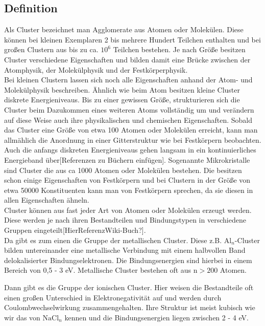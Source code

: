 \subsection{Definition}
Als Cluster bezeichnet man Agglomerate aus Atomen oder Molekülen. Diese können bei kleinen Exemplaren 2 bis mehrere Hundert Teilchen enthalten und bei großen Clustern aus bis zu ca. $\mathrm{10^6}$ Teilchen bestehen. Je nach Größe besitzen Cluster verschiedene Eigenschaften und bilden damit eine Brücke zwischen der Atomphysik, der Molekülphysik und der Festkörperphysik.\\
Bei kleinen Clustern lassen sich noch alle Eigenschaften anhand der Atom- und Molekülphysik beschreiben. Ähnlich wie beim Atom besitzen kleine Cluster diskrete Energieniveaus.
Bis zu einer gewissen Größe, strukturieren sich die Cluster beim Dazukommen eines weiteren Atoms vollständig um und verändern auf diese Weise auch ihre physikalischen und chemischen Eigenschaften. Sobald das Cluster eine Größe von etwa 100 Atomen oder Molekülen erreicht, kann man allmählich die Anordnung in einer Gitterstruktur wie bei Festkörpern beobachten. Auch die anfangs diskreten Energieniveaus gehen langsam in ein kontinuierliches Energieband über[Referenzen zu Büchern einfügen].
Sogenannte Mikrokristalle sind Cluster die aus ca 1000 Atomen oder Molekülen bestehen. Die besitzen schon einige Eigenschaften von Festkörpern und bei Clustern in der Größe von etwa 50000 Konstituenten kann man von Festkörpern sprechen, da sie diesen in allen Eigenschaften ähneln. \\

Cluster können aus fast jeder Art von Atomen oder Molekülen erzeugt werden. Diese werden je nach ihren Bestandteilen und Bindungstypen in verschiedene Gruppen eingeteilt[HierReferenzWiki-Buch?]. \\

Da gibt es zum einen die Gruppe der metallischen Cluster. Diese z.B. $\mathrm{Al}_n$-Cluster bilden untereinander eine metallische Verbindung mit einem halbvollen Band delokalisierter Bindungselektronen. Die Bindungsenergien sind hierbei in einem Bereich von 0,5 - 3 eV. Metallische Cluster bestehen oft aus $\mathrm{n > 200}$ Atomen.

Dann gibt es die Gruppe der ionischen Cluster. Hier weisen die Bestandteile oft einen großen Unterschied in Elektronegativität auf und werden durch Coulombwechselwirkung zusammengehalten. Ihre Struktur ist meist kubisch wie wir das von $\mathrm{NaCl}_n$ kennen und die Bindungsenergien liegen zwischen 2 - 4 eV. 

